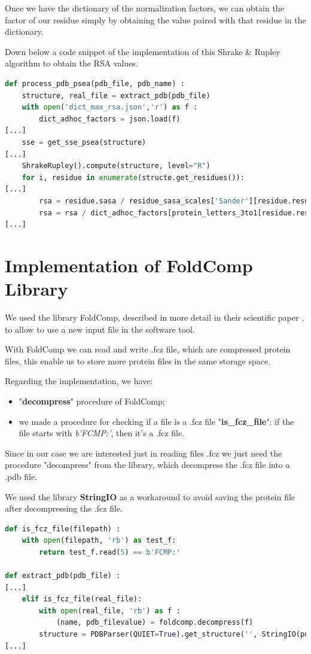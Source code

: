 Once we have the dictionary of the normalization factors, we can obtain the factor of our residue simply by obtaining the value paired with that residue in the dictionary.

Down below a code snippet of the implementation of this Shrake \& Rupley algorithm to obtain the RSA values.

\begin{lstlisting}[language=Python, caption=Integration of rsa with SASA on process\_pdb\_psea procedure]
def process_pdb_psea(pdb_file, pdb_name) :
    structure, real_file = extract_pdb(pdb_file)
    with open('dict_max_rsa.json','r') as f :
        dict_adhoc_factors = json.load(f)
[...]
    sse = get_sse_psea(structure)
[...]
    ShrakeRupley().compute(structure, level="R")
    for i, residue in enumerate(structe.get_residues()):
[...]
        rsa = residue.sasa / residue_sasa_scales['Sander'][residue.resname]
        rsa = rsa / dict_adhoc_factors[protein_letters_3to1[residue.resname]]
[...]
\end{lstlisting}

\pagebreak

\section{Implementation of FoldComp Library}
We used the library FoldComp, described in more detail in their scientific paper \cite{foldcomp}, to allow to use a new input file in the software tool.

With FoldComp we can read and write .fcz file, which are compressed protein files, this enable us to store more protein files in the same storage space.

Regarding the implementation, we have:
\begin{itemize}
    \item "\textbf{decompress}" procedure of FoldComp;
    \item we made a procedure for checking if a file is a .fcz file "\textbf{is\_fcz\_file}": if the file starts with \textit{b'FCMP:'}, then it's a .fcz file.
\end{itemize}
Since in our case we are interested just in reading files .fcz we just need the procedure "decompress" from the library, which decompress the .fcz file into a .pdb file.

We used the library \textbf{StringIO} as a workaround to avoid saving the protein file after decompressing the .fcz file.

\begin{lstlisting}[language=Python, caption=Integration of FoldComp]
def is_fcz_file(filepath) :
    with open(filepath, 'rb') as test_f:
        return test_f.read(5) == b'FCMP:'

def extract_pdb(pdb_file) :
[...]
    elif is_fcz_file(real_file):
        with open(real_file, 'rb') as f :
            (name, pdb_filevalue) = foldcomp.decompress(f)
        structure = PDBParser(QUIET=True).get_structure('', StringIO(pdb_filevalue))
[...]
\end{lstlisting}
